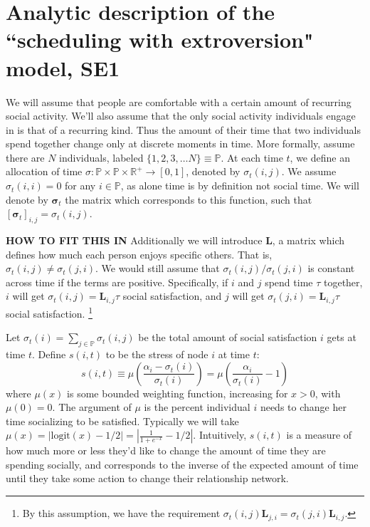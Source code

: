 \documentclass[]{article}
\begin{document}
	\section{Analytic description of the ``scheduling with extroversion" model, SE1}
	We will assume that people are comfortable with a certain amount of recurring social activity. 
	We'll also assume that the only social activity individuals engage in is that of a recurring kind.
	Thus the amount of their time that two individuals spend together change only at discrete moments in time.
	More formally, assume there are $N$ individuals, labeled $\{1,2,3,\dots N\} \equiv \mathbb{P}$.
	At each time $t$, we define an allocation of time $\sigma: \mathbb{P} \times \mathbb{P} \times \mathbb{R^+} \to [0,1]$, denoted by $\sigma_t(i,j)$. We assume $\sigma_t(i,i) = 0$ for any $i\in\mathbb{P}$, as alone time is by definition not social time. We will denote by $\boldsymbol{\sigma}_t$ the matrix which corresponds to this function, such that $[\boldsymbol{\sigma}_t]_{i,j} = \sigma_t(i,j)$.
	
	\textbf{HOW TO FIT THIS IN}
	Additionally we will introduce $\boldsymbol{L}$, a matrix which defines how much each person enjoys specific others.
	That is, $\sigma_t(i,j) \neq \sigma_t(j,i)$.
	We would still assume that $\sigma_t(i,j) / \sigma_t(j,i)$ is constant across time if the terms are positive.
	Specifically, if $i$ and $j$ spend time $\tau$ together, $i$ will get $\sigma_t(i,j) = \boldsymbol{L}_{i,j} \tau$ social satisfaction, and $j$ will get $\sigma_t(j,i) = \boldsymbol{L}_{i,j} \tau$ social satisfaction. \footnote{By this assumption, we have the requirement $\sigma_t(i,j)\boldsymbol{L}_{j,i} = \sigma_t(j,i)\boldsymbol{L}_{i,j}$.}
	
	Let $\sigma_t(i) = \sum_{j\in\mathbb{P}} \sigma_t(i, j)$ be the total amount of social satisfaction $i$ gets at time $t$.
	Define $s(i,t)$ to be the stress of node $i$ at time $t$:
	\[
	s(i,t) \equiv \mu\left( \frac{\alpha_i - \sigma_t(i)}{\sigma_t(i)} \right) = \mu\left( \frac{\alpha_i}{\sigma_t(i)} - 1 \right)
	\]
	where $\mu(x)$ is some bounded weighting function, increasing for $x > 0$, with $\mu(0) = 0$. The argument of $\mu$ is the percent individual $i$ needs to change her time socializing to be satisfied. 
	Typically we will take $\mu(x) = |\text{logit}(x) - 1/2| = |\frac{1}{1+e^{-x}} - 1/2|$.
	Intuitively, $s(i,t)$ is a measure of how much more or less they'd like to change the amount of time they are spending socially, and corresponds to the inverse of the expected amount of time until they take some action to change their relationship network.
	
\end{document}
